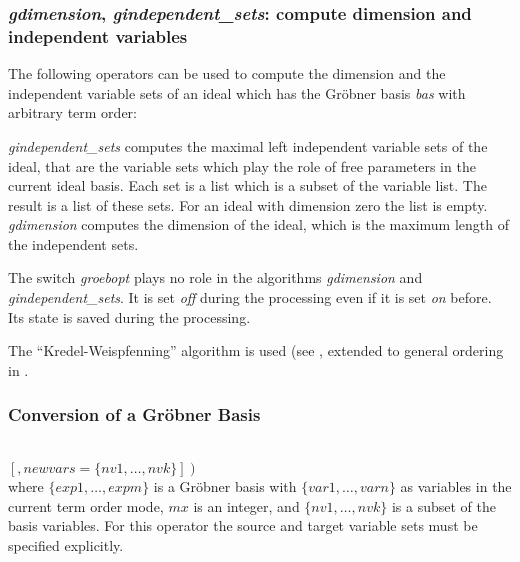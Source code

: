 \subsubsection{\emph{gdimension}, \emph{gindependent\_sets}: compute dimension and
independent variables}
The following operators can be used to compute the dimension
and the independent variable sets of an ideal which has the
Gr\"obner basis {\it bas} with arbitrary term order:
\begin{description}
\item[\emph{gdimension bas}]
  \hypertarget{operator:GDIMENSION}{}
\item[\emph{gindependent\_sets bas}]
  \hypertarget{operator:GINDEPENDENT_SETS}{}
{\it gindependent\_sets} computes the maximal
left independent variable sets of the ideal, that are
the variable sets which play the role of free parameters in the
current ideal basis. Each set is a list which is a subset of the
variable list. The result is a list of these sets. For an
ideal with dimension zero the list is empty.
{\it gdimension} computes the dimension of the ideal,
which is the maximum length of the independent sets.
\end{description}

The switch \emph{groebopt} plays no role in the algorithms \emph{gdimension} and
\emph{gindependent\_sets}. It is set \emph{off} during the processing even if
it is set \emph{on} before. Its state is saved during the processing.

The ``Kredel-Weispfenning'' algorithm is used (see \cite{Kredel:88a},
extended to general ordering in \cite{Becker:93}.

\subsubsection{Conversion of a Gr\"obner Basis}

\begin{description}
\item[{{\it glexconvert}$\left(\{exp,\ldots , expm\} \left[,\{var1
        \ldots , varn\}\right]\left[,maxdeg=mx\right]\right.$}]\mbox{}\\
  \hypertarget{operator:GLEXCONVERT}{}
$\left.\left[,newvars=\{nv1, \ldots , nvk\}\right]\right)$ \\
where $\{exp1, \ldots , expm\}$ is a Gr\"obner basis with
$\{var1, \ldots , varn\}$ as variables in the current term order mode,
$mx$ is an integer, and
$\{nv1, \ldots , nvk\}$ is a subset of the basis variables.
For this operator the source and target variable sets must be specified
explicitly.
\end{description}

